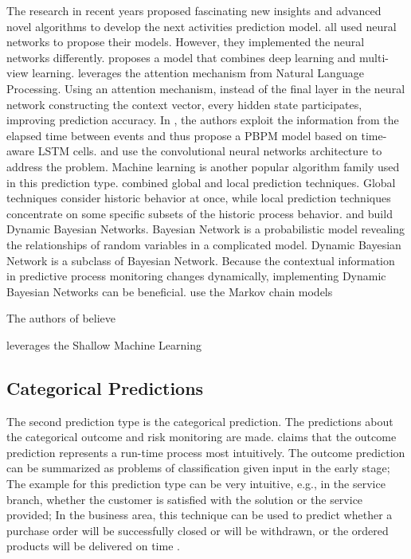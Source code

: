 \documentclass[runningheads]{llncs}
\begin{document}
		The research in recent years proposed fascinating new insights and advanced novel algorithms to develop the next activities prediction model. \cite{art-5} \cite{art-7} \cite{art-14} \cite{art-23} \cite{art-24} \cite{art-28} \cite{art-31} all used neural networks to propose their models. However, they implemented the neural networks differently. \cite{art-5} proposes a model that combines deep learning and multi-view learning. \cite{art-7} leverages the attention mechanism from Natural Language Processing. Using an attention mechanism, instead of the final layer in the neural network constructing the context vector, every hidden state participates, improving prediction accuracy. In \cite{art-14}, the authors exploit the information from the elapsed time between events and thus propose a PBPM model based on time-aware LSTM cells. \cite{art-23} and \cite{art-24} use the convolutional neural networks architecture to address the problem. Machine learning is another popular algorithm family used in this prediction type. \cite{art-1} combined global and local prediction techniques. Global techniques consider historic behavior at once, while local prediction techniques concentrate on some specific subsets of the historic process behavior. \cite{art-25} and \cite{art-30} build Dynamic Bayesian Networks. Bayesian Network is a probabilistic model revealing the relationships of random variables in a complicated model. Dynamic Bayesian Network is a subclass of Bayesian Network. Because the contextual information in predictive process monitoring changes dynamically, implementing Dynamic Bayesian Networks can be beneficial. \cite{art-10} use the Markov chain models
		
		The authors of \cite{art-30} believe  
		
		
		\cite{art-21} leverages the Shallow Machine Learning
		
		
		
		
		
		
		
		
		
		
		
		
		
		
		\subsection{Categorical Predictions}
		The second prediction type is the categorical prediction. The predictions about the categorical outcome and risk monitoring are made. \cite{art-9} claims that the outcome prediction represents a run-time process most intuitively. The outcome prediction can be summarized as problems of classification given input in the early stage; The example for this prediction type can be very intuitive, e.g., in the service branch, whether the customer is satisfied with the solution or the service provided; In the business area, this technique can be used to predict whether a purchase order will be successfully closed or will be withdrawn, or the ordered products will be delivered on time \cite{art-12}.
	
\end{document}
